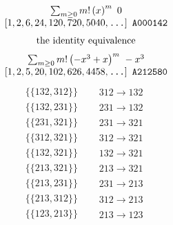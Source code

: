 \allowdisplaybreaks
\begin{tiny}
$$
\begin{matrix}
\sum_{m \geq 0} m! \left(
x
\right)^m
\ 
0
\\
\left[1, 2, 6, 24, 120, 720, 5040, \text{\texttt{...}}\right]
\ 
\texttt{A000142}
\end{matrix}
$$
\vspace{-1em}
\begin{align}
\textnormal{the identity equivalence}
\end{align}
$$
\begin{matrix}
\sum_{m \geq 0} m! \left(
-x^{3} + x
\right)^m
\ 
-x^{3}
\\
\left[1, 2, 5, 20, 102, 626, 4458, \text{\texttt{...}}\right]
\ 
\texttt{A212580}
\end{matrix}
$$
\vspace{-1em}
\begin{align}
\{\{132, 312\}\}
\quad
&
\begin{matrix}
312 \to 132
\end{matrix}
\\
\{\{132, 231\}\}
\quad
&
\begin{matrix}
231 \to 132
\end{matrix}
\\
\{\{231, 321\}\}
\quad
&
\begin{matrix}
231 \to 321
\end{matrix}
\\
\{\{312, 321\}\}
\quad
&
\begin{matrix}
312 \to 321
\end{matrix}
\\
\{\{132, 321\}\}
\quad
&
\begin{matrix}
132 \to 321
\end{matrix}
\\
\{\{213, 321\}\}
\quad
&
\begin{matrix}
213 \to 321
\end{matrix}
\\
\{\{213, 231\}\}
\quad
&
\begin{matrix}
231 \to 213
\end{matrix}
\\
\{\{213, 312\}\}
\quad
&
\begin{matrix}
312 \to 213
\end{matrix}
\\
\{\{123, 213\}\}
\quad
&
\begin{matrix}
213 \to 123
\end{matrix}

\end{align}
\end{tiny}
